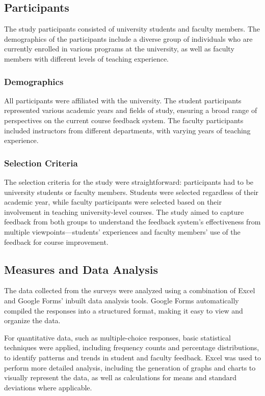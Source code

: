 \documentclass[conference]{IEEEtran}
\begin{document}
\subsection{Participants}
The study participants consisted of university students and faculty members. The demographics of the participants include a diverse group of individuals who are currently enrolled in various programs at the university, as well as faculty members with different levels of teaching experience.

\subsubsection{Demographics}
All participants were affiliated with the university. The student participants represented various academic years and fields of study, ensuring a broad range of perspectives on the current course feedback system. The faculty participants included instructors from different departments, with varying years of teaching experience.

\subsubsection{Selection Criteria}
The selection criteria for the study were straightforward: participants had to be university students or faculty members. Students were selected regardless of their academic year, while faculty participants were selected based on their involvement in teaching university-level courses. The study aimed to capture feedback from both groups to understand the feedback system’s effectiveness from multiple viewpoints—students' experiences and faculty members' use of the feedback for course improvement.


\subsection{Measures and Data Analysis}
The data collected from the surveys were analyzed using a combination of Excel and Google Forms' inbuilt data analysis tools. Google Forms automatically compiled the responses into a structured format, making it easy to view and organize the data. 

For quantitative data, such as multiple-choice responses, basic statistical techniques were applied, including frequency counts and percentage distributions, to identify patterns and trends in student and faculty feedback. Excel was used to perform more detailed analysis, including the generation of graphs and charts to visually represent the data, as well as calculations for means and standard deviations where applicable.
\end{document}
